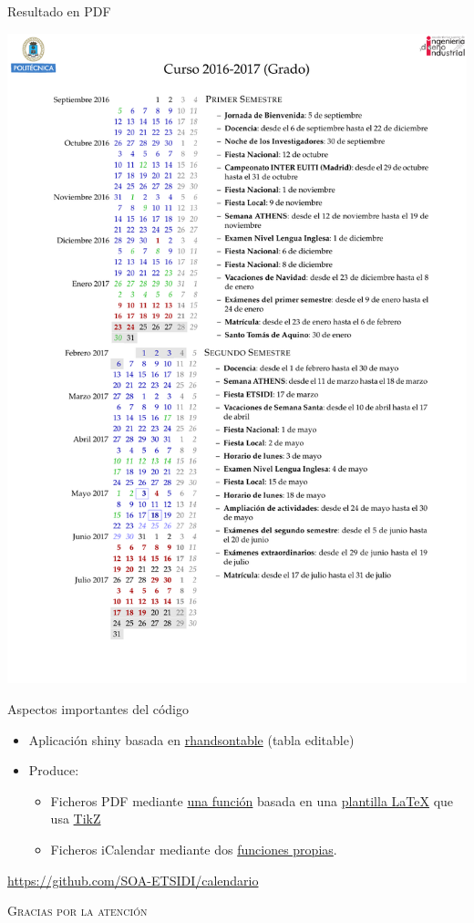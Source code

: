 \documentclass[spanish, xcolor={usenames,svgnames,dvipsnames}]{beamer}
\begin{document}
\begin{frame}[label={sec:org4aace17}]{Resultado en PDF}
\begin{center}
\includegraphics[width=.9\linewidth]{images/Calendario_Grado_2016_2017.pdf}
\end{center}
\end{frame}

\begin{frame}[label={sec:org3c5afae}]{Aspectos importantes del código}
\begin{block}{}
\begin{itemize}
\item Aplicación shiny basada en \href{http://jrowen.github.io/rhandsontable/}{rhandsontable} (tabla editable)
\item Produce:
\begin{itemize}
\item Ficheros PDF mediante \href{https://github.com/SOA-ETSIDI/calendario/blob/master/csv2pdf.R}{una función} basada en una \href{https://github.com/SOA-ETSIDI/calendario/blob/master/documentCal.tex}{plantilla \LaTeX{}} que usa \href{https://en.wikipedia.org/wiki/PGF/TikZ}{TikZ}
\item Ficheros iCalendar mediante dos \href{https://github.com/SOA-ETSIDI/calendario/blob/master/csv2ics.R}{funciones propias}.
\end{itemize}
\end{itemize}
\end{block}
\begin{block}{}
\url{https://github.com/SOA-ETSIDI/calendario}
\end{block}
\end{frame}

\begin{frame}[plain,label={sec:orgf31eaa3}]{}
\begin{center}
\Huge \textsc{Gracias por la atención}
\end{center}
\end{frame}
\end{document}
